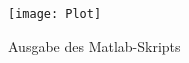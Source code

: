 \documentclass[DIN, pagenumber=false, fontsize=11pt, parskip=half]{scrartcl}
\begin{document}
    \subsection{}
    
    \subsection{}
    
    
    \subsection{}
    
    \subsection{}
    
    \begin{figure}[H]
        \centering
        \texttt{[image: Plot]}
        \caption{Ausgabe des Matlab-Skripts} 
    \end{figure}
\end{document}
